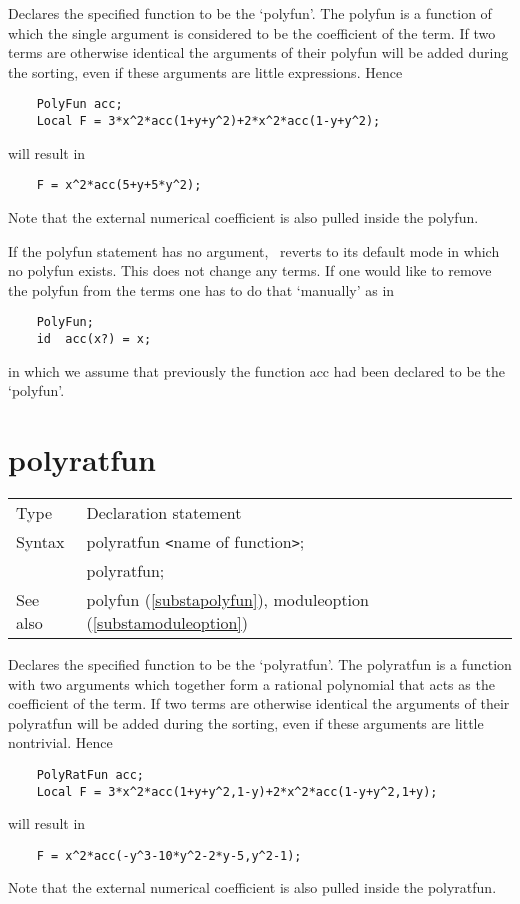 \noindent Declares the specified function to be the 
`polyfun'. The polyfun is a function of which the single 
argument is considered to be the 
coefficient of the term. If two terms are otherwise 
identical the arguments of their polyfun will be added during the sorting, 
even if these arguments are little expressions. Hence
\begin{verbatim}
    PolyFun acc;
    Local F = 3*x^2*acc(1+y+y^2)+2*x^2*acc(1-y+y^2);
\end{verbatim}
will result in
\begin{verbatim}
    F = x^2*acc(5+y+5*y^2);
\end{verbatim}
Note that the external numerical coefficient is also 
pulled inside the polyfun.

\noindent If the polyfun statement has no argument, \FORM\ reverts to its 
default mode in which no polyfun exists. This does not change any terms. If 
one would like to remove the polyfun from the terms one has to do that 
`manually' as in
\begin{verbatim}
    PolyFun;
    id  acc(x?) = x;
\end{verbatim}
in which we assume that previously the function acc had been declared to be 
the `polyfun'. \vspace{10mm}


\section{polyratfun}
\label{substapolyratfun}

\noindent \begin{tabular}{ll}
Type & Declaration statement\\
Syntax & polyratfun {\tt<}name of function{\tt>}; \\
       & polyratfun;
\\ See also & polyfun (\ref{substapolyfun}),
			  moduleoption (\ref{substamoduleoption})
\end{tabular}\vspace{4mm}

\noindent Declares the specified function to be the 
`polyratfun'. The polyratfun is a function with two 
arguments which together form a rational polynomial that 
acts as the 
coefficient of the term. If two terms are otherwise 
identical the arguments of their polyratfun will be added during the sorting, 
even if these arguments are little nontrivial. Hence
\begin{verbatim}
    PolyRatFun acc;
    Local F = 3*x^2*acc(1+y+y^2,1-y)+2*x^2*acc(1-y+y^2,1+y);
\end{verbatim}
will result in
\begin{verbatim}
    F = x^2*acc(-y^3-10*y^2-2*y-5,y^2-1);
\end{verbatim}
Note that the external numerical coefficient is also 
pulled inside the polyratfun.

